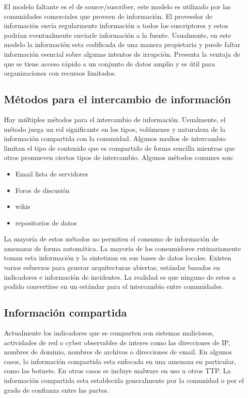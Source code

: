 El modelo faltante es el de source/suscriber, este modelo es utilizado por las 
comunidades comerciales que proveen de información. El proveedor de información 
envía regularmente información a todos los suscriptores y estos podrían 
eventualmente enviarle información a la fuente. Usualmente, en este modelo la 
información esta codificada de una manera propietaria y puede faltar 
información esencial sobre algunas intentos de irrupción. Presenta la ventaja de 
que se tiene acceso rápido a un conjunto de datos amplio y es útil para 
organizaciones con recursos limitados.

\subsection{Métodos para el intercambio de información}

Hay múltiples métodos para el intercambio de información. Usualmente, el método 
juega un rol significante en los tipos, volúmenes y naturaleza de la información 
compartida con la comunidad. Algunos medios de intercambio limitan el tipo de 
contenido que es compartido de forma sencilla mientras que otros promueven 
ciertos tipos de intercambio.
Algunos métodos comunes son:
\begin{itemize}
  \item Email lista de servidores
  \item Foros de discusión
  \item wikis
  \item repositorios de datos
\end{itemize}
La mayoría de estos métodos no permiten el consumo de información de amenazas de 
forma automática. La mayoría de los consumidores rutinariamente toman esta 
información y la sintetizan en sus bases de datos locales.
Existen varios esfuerzos para generar arquitecturas abiertas, estándar 
basados en indicadores e información de incidentes. La realidad es que ninguno 
de estos a podido convertirse en un estándar para el intercambio entre comunidades.


\subsection{Información compartida}
Actualmente los indicadores que se comparten son sistemas maliciosos, actividades de red 
o cyber observables de interes como las direcciones de IP, nombres de dominio, 
nombres de archivos o direcciones de email. En algunos casos, la información 
compartida esta enfocada en una amenaza en particular, como las botnets. En 
otros casos se incluye malware en uso u otros TTP. La información compartida 
esta establecida generalmente por la comunidad o por el grado de confianza entre 
las partes.

